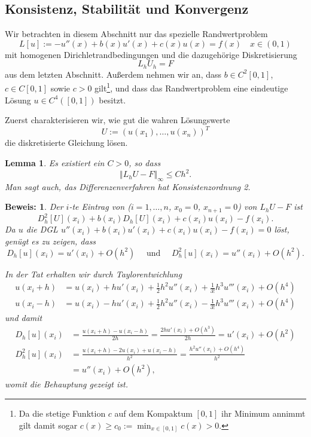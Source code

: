 \documentclass[12pt,a4paper]{book}
\theoremstyle{break}
\newtheorem{lemma}[theorem]{Lemma}
\theoremstyle{nonumberplain}
\newtheorem{beweis}{Beweis:}
\newcommand{\norm}[1]{\left\Vert#1\right\Vert}		%
\newcommand{\1}{\mathbbm{1}} 			      	%
\begin{document}
\subsection{Konsistenz, Stabilität und Konvergenz}

Wir betrachten in diesem Abschnitt nur das spezielle Randwertproblem
\[
L[u]:=-u''(x) + b(x)u'(x) + c(x)u(x)=f(x) \quad x\in (0,1)
\]
mit homogenen Dirichletrandbedingungen und die dazugehörige Diskretisierung
\[
L_h U_h=F
\]
aus dem letzten Abschnitt. Außerdem nehmen wir an, dass $b\in C^2[0,1]$, $c\in C[0,1]$
sowie $c>0$ gilt\footnote{Da die stetige Funktion $c$ auf dem Kompaktum $[0,1]$ ihr Minimum annimmt gilt damit sogar $c(x)\geq c_0:=\min_{x\in [0,1]} c(x)>0$.}, und dass das Randwertproblem
eine eindeutige Lösung $u\in C^4([0,1])$ besitzt. 

Zuerst charakterisieren wir, wie gut die wahren Lösungswerte
\[
U:=(u(x_1),\ldots,u(x_{n}))^T
\]
die diskretisierte Gleichung lösen.

\begin{lemma}\label{lemma:RW_Konsistenz}
Es existiert ein $C>0$, so dass 
\[
\norm{L_h U - F}_\infty \leq C h^2.
\]
Man sagt auch, das Differenzenverfahren hat \emph{Konsistenzordnung} 2.
\end{lemma}
\begin{beweis}
Der $i$-te Eintrag von  ($i=1,\ldots,n$, $x_0=0$, $x_{n+1}=0$) von  $L_h U  - F$ ist 
\[
D_h^2[U](x_i)+b(x_i)D_h[U](x_i)+c(x_i)u(x_i)-f(x_i).
\]
Da $u$ die DGL $u''(x_i)+b(x_i)u'(x_i)+c(x_i)u(x_i)-f(x_i)=0$ löst, genügt es zu zeigen, dass
\[
D_h[u](x_i)=u'(x_i)+O(h^2)\quad \mbox{ und } \quad D_h^2[u](x_i)=u''(x_i)+O(h^2).
\]

In der Tat erhalten wir durch Taylorentwichlung
\begin{align*}
u(x_i+h) &=u(x_i)+hu'(x_i)+\frac{1}{2}h^2u''(x_i)+\frac{1}{3!}h^3u'''(x_i)+O(h^4)\\
u(x_i-h) &=u(x_i)-hu'(x_i)+\frac{1}{2}h^2u''(x_i)-\frac{1}{3!}h^3u'''(x_i)+O(h^4)
\end{align*}
und damit
\begin{align*}
D_h[u](x_i)&=\frac{u(x_i+h)-u(x_i-h)}{2h}= \frac{2h u'(x_i)+O(h^3)}{2h}=u'(x_i)+O(h^2)\\
D^2_h[u](x_i)&= \frac{u(x_i+h)-2u(x_i)+u(x_i-h)}{h^2}=
\frac{h^2u''(x_i) + O(h^4)}{h^2}\\
&=u''(x_i)+O(h^2),
\end{align*}
womit die Behauptung gezeigt ist.
\end{beweis}
\end{document}
